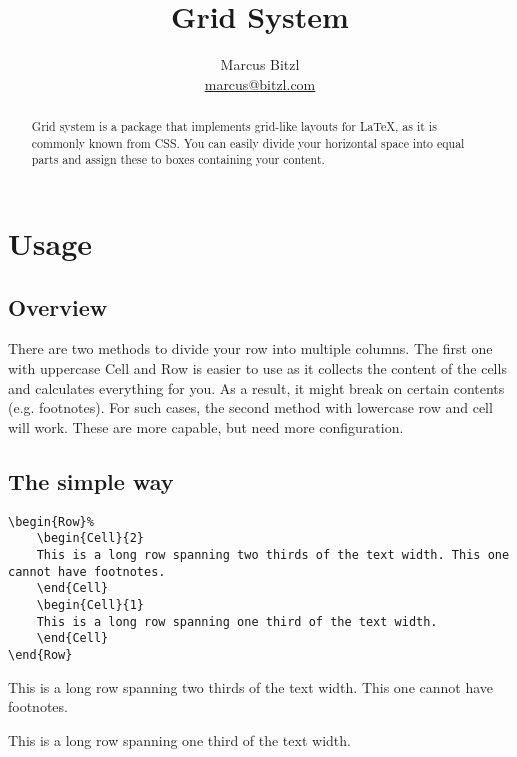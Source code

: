 \documentclass[DIV13]{scrartcl}
\title{Grid System}
\author{Marcus Bitzl\\ \url{marcus@bitzl.com}}
\renewcommand{\emph}[1]{\textcolor{red!65!black}{#1}}
\begin{document}
\maketitle

\begin{abstract}
Grid system is a package that implements grid-like layouts for \LaTeX, as it is commonly known from CSS. You can easily divide your horizontal space into equal parts and assign these to boxes containing your content.
\end{abstract}

\section{Usage}
\subsection{Overview}
There are two methods to divide your row into multiple columns. The first one with uppercase \emph{Cell} and \emph{Row} is easier to use as it collects the content of the cells and calculates everything for you. As a result, it might break on certain contents (e.g. footnotes). For such cases, the second method with lowercase \emph{row} and \emph{cell} will work. These are more capable, but need more configuration.

\medskip

\subsection{The simple way}
\begin{lstlisting}
\begin{Row}%
    \begin{Cell}{2}
    This is a long row spanning two thirds of the text width. This one cannot have footnotes.
    \end{Cell}
    \begin{Cell}{1}
    This is a long row spanning one third of the text width.
    \end{Cell}
\end{Row}
\end{lstlisting}

\begin{Row}%
	\begin{Cell}{2}
	This is a long row spanning two thirds of the text width. This one cannot have footnotes.
	\end{Cell}
	\begin{Cell}{1}
	This is a long row spanning one third of the text width.
	\end{Cell}
\end{Row}
\end{document}
